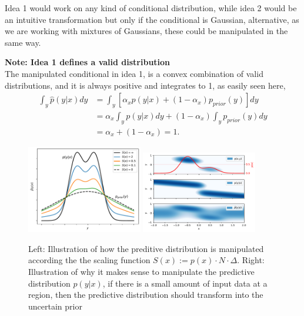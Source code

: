 Idea 1 would work on any kind of conditional distribution, while idea 2 would be an intuitive transformation
but only if the conditional is Gaussian, alternative, as we are working with mixtures 
of Gaussians, these could be manipulated in the same way. 

\begin{tcolorbox}[
    sharp corners,
    boxrule=0mm,
    enhanced,
    borderline west={4pt}{0pt}{gray},
    colframe=drGray,
    colback=drGray,
    coltitle=black,
]
{\large \textbf{Note: Idea 1 defines a valid distribution}}\\
    The manipulated conditional in idea 1, is a convex combination of valid distributions, 
    and it is always positive and integrates to 1, as easily seen here, 
    \begin{align*}
        \int_y \hat p(y|x) dy &= \int_y \left[ \alpha_x p(y|x) + (1-\alpha_x)p_{prior}(y) \right] dy\\
        &= \alpha_x \int_y p(y|x)dy +(1-\alpha_x) \int_y p_{prior}(y)dy \\
        &= \alpha_x + (1-\alpha_x) = 1.
    \end{align*}
\end{tcolorbox}


\begin{figure}[H]
    \centering
    \includegraphics[width=0.45\textwidth]{Pictures/mixture_predictive_bayesian.pdf}
    \includegraphics[width=0.45\textwidth]{Pictures/mixture_predictive_bayesian2D.pdf}
    \caption{Left: Illustration of how the preditive distribution is manipulated according
    the the scaling function $S(x) := p(x)\cdot N\cdot \Delta$. Right: Illustration of why it makes
    sense to manipulate the predictive distribution $p(y|x)$, if there is a small amount of input data
    at a region, then the predictive distribution should transform into the uncertain prior}
    \label{pred_dist_manipulation}
\end{figure}

